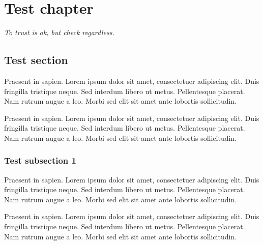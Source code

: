

\chapter*{Test chapter}

\begin{flushright}
\parbox{0.6\textwidth}{
\emph{To trust is ok, but check regardless.\newline
{} } }
\end{flushright}

\section*{Test section}

Praesent in sapien. Lorem ipsum dolor sit amet, consectetuer adipiscing elit.
Duis fringilla tristique neque. Sed interdum libero ut metus. Pellentesque placerat.
Nam rutrum augue a leo. Morbi sed elit sit amet ante lobortis sollicitudin.

Praesent in sapien. Lorem ipsum dolor sit amet, consectetuer adipiscing elit.
Duis fringilla tristique neque. Sed interdum libero ut metus. Pellentesque placerat.
Nam rutrum augue a leo. Morbi sed elit sit amet ante lobortis sollicitudin.

\subsection*{Test subsection 1}
Praesent in sapien. Lorem ipsum dolor sit amet, consectetuer adipiscing elit.
Duis fringilla tristique neque. Sed interdum libero ut metus. Pellentesque placerat.
Nam rutrum augue a leo. Morbi sed elit sit amet ante lobortis sollicitudin.

Praesent in sapien. Lorem ipsum dolor sit amet, consectetuer adipiscing elit.
Duis fringilla tristique neque. Sed interdum libero ut metus. Pellentesque placerat.
Nam rutrum augue a leo. Morbi sed elit sit amet ante lobortis sollicitudin.

